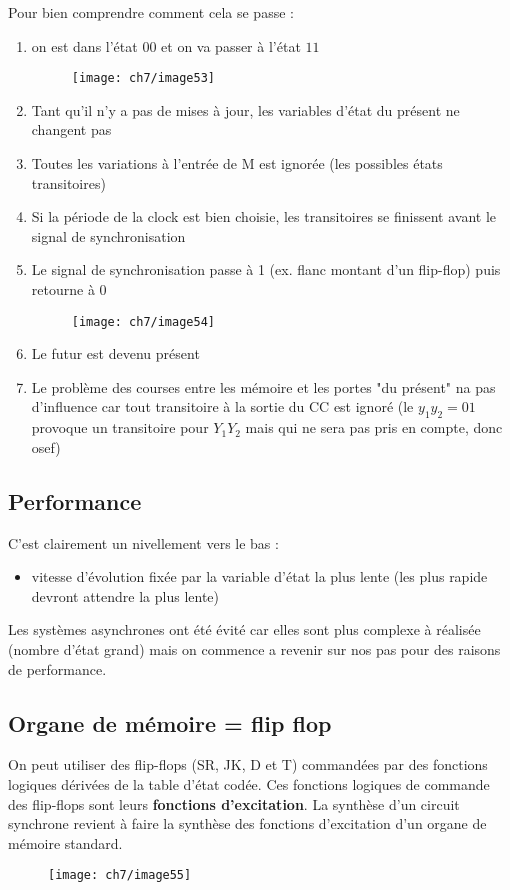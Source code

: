 Pour bien comprendre comment cela se passe : 
\begin{enumerate}
	\item on est dans l'état $00$ et on va passer à l'état $11$
	\begin{figure}[H] 
		\centering 
		\texttt{[image: ch7/image53]} 
	\end{figure}
	\item Tant qu'il n'y a pas de mises à jour, les variables d'état du présent ne changent pas
	\item Toutes les variations à l'entrée de M est ignorée (les possibles états transitoires)
	\item Si la période de la clock est bien choisie, les transitoires se finissent avant le signal de synchronisation
	\item Le signal de synchronisation passe à 1 (ex. flanc montant d'un flip-flop) puis retourne à 0 
	\begin{figure}[H] 
		\centering 
		\texttt{[image: ch7/image54]} 
	\end{figure}
	\item Le futur est devenu présent
	\item Le problème des courses entre les mémoire et les portes "du présent" na pas d'influence car tout transitoire à la sortie du CC est ignoré (le $y_1y_2=01$ provoque un transitoire pour $Y_1Y_2$ mais qui ne sera pas pris en compte, donc osef) 
\end{enumerate}
\subsection{Performance}
C'est clairement un nivellement vers le bas :
\begin{itemize}
	\item vitesse d'évolution fixée par la variable d'état la plus lente (les plus rapide devront attendre la plus lente)
\end{itemize}
Les systèmes asynchrones ont été évité car elles sont plus complexe à réalisée (nombre d'état grand) mais on commence a revenir sur nos pas pour des raisons de performance.

\subsection{Organe de mémoire = flip flop}
On peut utiliser des flip-flops (SR, JK, D et T) commandées par des fonctions logiques dérivées de la table d'état codée. Ces fonctions logiques de commande des flip-flops sont leurs \textbf{fonctions d'excitation}. La synthèse d'un circuit synchrone revient à faire la synthèse des fonctions d'excitation d'un organe de mémoire standard.
\begin{figure}[H] 
	\centering 
	\texttt{[image: ch7/image55]} 
\end{figure}

